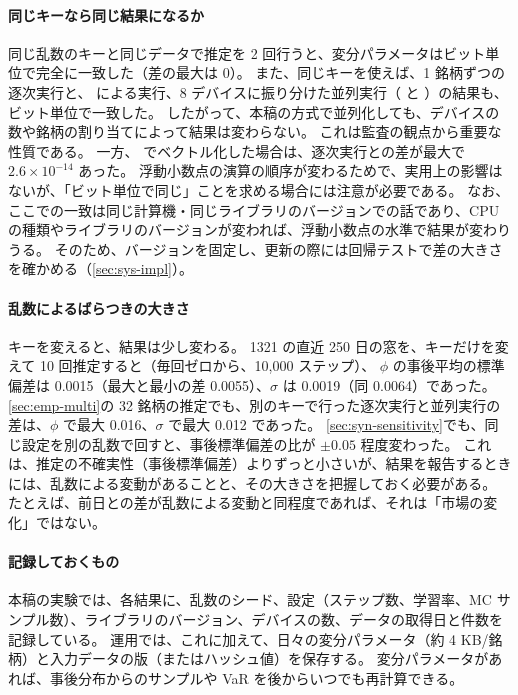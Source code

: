 \paragraph{同じキーなら同じ結果になるか}
同じ乱数のキーと同じデータで推定を 2 回行うと、変分パラメータはビット単位で完全に一致した（差の最大は 0）。
また、同じキーを使えば、1 銘柄ずつの逐次実行と、 による実行、8 デバイスに振り分けた並列実行（ と ）の結果も、ビット単位で一致した。
したがって、本稿の方式で並列化しても、デバイスの数や銘柄の割り当てによって結果は変わらない。
これは監査の観点から重要な性質である。
一方、 でベクトル化した場合は、逐次実行との差が最大で $2.6 \times 10^{-14}$ あった。
浮動小数点の演算の順序が変わるためで、実用上の影響はないが、「ビット単位で同じ」ことを求める場合には注意が必要である。
なお、ここでの一致は同じ計算機・同じライブラリのバージョンでの話であり、CPU の種類やライブラリのバージョンが変われば、浮動小数点の水準で結果が変わりうる。
そのため、バージョンを固定し、更新の際には回帰テストで差の大きさを確かめる（\cref{sec:sys-impl}）。

\paragraph{乱数によるばらつきの大きさ}
キーを変えると、結果は少し変わる。
1321 の直近 250 日の窓を、キーだけを変えて 10 回推定すると（毎回ゼロから、10,000 ステップ）、
$\phi$ の事後平均の標準偏差は 0.0015（最大と最小の差 0.0055）、$\sigma$ は 0.0019（同 0.0064）であった。
\cref{sec:emp-multi}の 32 銘柄の推定でも、別のキーで行った逐次実行と並列実行の差は、$\phi$ で最大 0.016、$\sigma$ で最大 0.012 であった。
\cref{sec:syn-sensitivity}でも、同じ設定を別の乱数で回すと、事後標準偏差の比が $\pm 0.05$ 程度変わった。
これは、推定の不確実性（事後標準偏差）よりずっと小さいが、結果を報告するときには、乱数による変動があることと、その大きさを把握しておく必要がある。
たとえば、前日との差が乱数による変動と同程度であれば、それは「市場の変化」ではない。

\paragraph{記録しておくもの}
本稿の実験では、各結果に、乱数のシード、設定（ステップ数、学習率、MC サンプル数）、ライブラリのバージョン、デバイスの数、データの取得日と件数を記録している。
運用では、これに加えて、日々の変分パラメータ（約 4 KB/銘柄）と入力データの版（またはハッシュ値）を保存する。
変分パラメータがあれば、事後分布からのサンプルや VaR を後からいつでも再計算できる。

